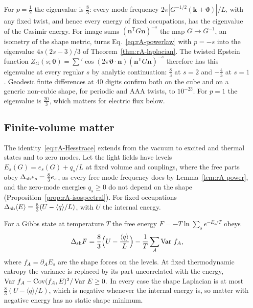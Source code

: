 For $p=\tfrac12$ the eigenvalue is $\tfrac83$: every mode frequency $2\pi|G^{-1/2}(\bm k+\bm\vartheta)|/L$, with any fixed twist, and hence every energy of fixed occupations, has the eigenvalue of the Casimir energy.
For image sums $(\bm n^{\mathsf T}G\bm n)^{-s}$ the map $G\to G^{-1}$, an isometry of the shape metric, turns Eq.~\eqref{eq:rA-powerlaw} with $p=-s$ into the eigenvalue $4s(2s-3)/3$ of Theorem~\ref{thm:rA-laplacian}.
The twisted Epstein function $Z_G(s;\bm\vartheta)=\sum'\cos(2\pi\bm\vartheta\cdot\bm n)(\bm n^{\mathsf T}G\bm n)^{-s}$ therefore has this eigenvalue at every regular $s$ by analytic continuation: $\tfrac83$ at $s=2$ and $-\tfrac43$ at $s=1$.
Geodesic finite differences at 40 digits confirm both on the cube and on a generic non-cubic shape, for periodic and AAA twists, to $10^{-23}$. %
For $p=1$ the eigenvalue is $\tfrac{20}3$, which matters for electric flux below.

\subsection{Finite-volume matter}
\label{rA:sh-matter}

The identity~\eqref{eq:rA-Hesstrace} extends from the vacuum to excited and thermal states and to zero modes.
Let the light fields have levels $E_s(G)=e_s(G)+q_s/L$ at fixed volume and couplings, where the free parts obey $\Delta_{\mathrm{sh}}e_s=\tfrac83e_s$, as every free mode frequency does by Lemma~\ref{lem:rA-power}, and the zero-mode energies $q_s\geq0$ do not depend on the shape (Proposition~\ref{prop:rA-isospectral}).
For fixed occupations $\Delta_{\mathrm{sh}}\langle E\rangle=\tfrac83(U-\langle q\rangle/L)$, with $U$ the internal energy.

\begin{rAtheorem}\label{thm:rA-nogo}
For a Gibbs state at temperature $T$ the free energy $F=-T\ln\sum_se^{-E_s/T}$ obeys
\begin{equation}
\Delta_{\mathrm{sh}}F=\frac83\Big(U-\frac{\langle q\rangle}{L}\Big)-\frac1T\sum_A\operatorname{Var}\,f_A ,
\label{eq:rA-nogo}
\end{equation}
where $f_A=\partial_AE_s$ are the shape forces on the levels.
At fixed thermodynamic entropy the variance is replaced by its part uncorrelated with the energy, $\operatorname{Var}\,f_A-\operatorname{Cov}(f_A,E)^2/\operatorname{Var}\,E\geq0$.
In every case the shape Laplacian is at most $\tfrac83(U-\langle q\rangle/L)$, which is negative whenever the internal energy is, so matter with negative energy has no static shape minimum.
\end{rAtheorem}

